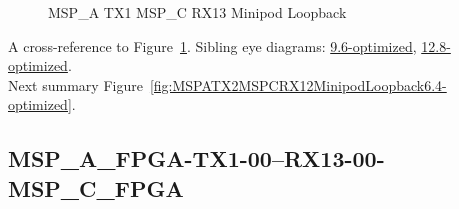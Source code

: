 \begin{figure}[h]
\begin{subfigure}{0.33\textwidth}
\hyperref[sec:MSPAFPGATX106RX1306MSPCFPGA6.4-optimized]{}
\end{subfigure}\hspace*{\fill}
\begin{subfigure}{0.33\textwidth}
\hyperref[sec:MSPAFPGATX107RX1307MSPCFPGA6.4-optimized]{}
\end{subfigure}\hspace*{\fill}
\begin{subfigure}{0.33\textwidth}
\hyperref[sec:MSPAFPGATX108RX1308MSPCFPGA6.4-optimized]{}
\end{subfigure}

\begin{subfigure}{0.33\textwidth}
\hyperref[sec:MSPAFPGATX109RX1309MSPCFPGA6.4-optimized]{}
\end{subfigure}\hspace*{\fill}
\begin{subfigure}{0.33\textwidth}
\hyperref[sec:MSPAFPGATX110RX1310MSPCFPGA6.4-optimized]{}
\end{subfigure}\hspace*{\fill}
\begin{subfigure}{0.33\textwidth}
\hyperref[sec:MSPAFPGATX111RX1311MSPCFPGA6.4-optimized]{}
\end{subfigure}

\caption{MSP\_A TX1 MSP\_C RX13 Minipod Loopback} \label{fig:MSPATX1MSPCRX13MinipodLoopback6.4-optimized}
\end{figure}

A cross-reference to Figure~\ref{fig:MSPATX1MSPCRX13MinipodLoopback6.4-optimized}.
Sibling eye diagrams: \hyperref[sec:MSPATX1MSPCRX13MinipodLoopback9.6-optimized]{9.6-optimized}, \hyperref[sec:MSPATX1MSPCRX13MinipodLoopback12.8-optimized]{12.8-optimized}. \\
Next summary Figure~\ref{fig:MSPATX2MSPCRX12MinipodLoopback6.4-optimized}.
\clearpage
% 
\subsection{MSP\_A\_FPGA-TX1-00--RX13-00-MSP\_C\_FPGA}\label{sec:MSPAFPGATX100RX1300MSPCFPGA6.4-optimized}

